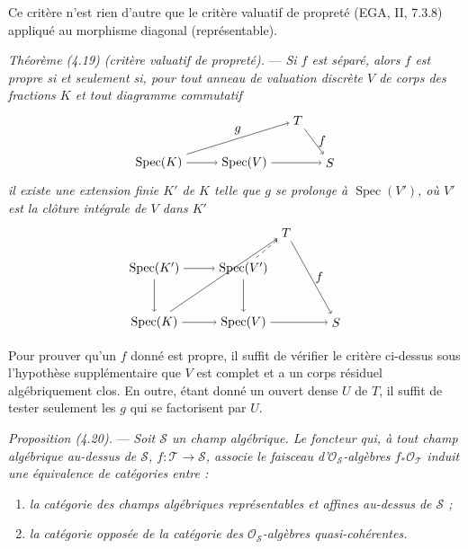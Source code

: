 \documentclass[10pt]{article}
\newcommand{\Spec}{\operatorname{Spec}}
\newcommand{\cO}{\mathcal O}
\begin{document}
Ce critère n'est rien d'autre que le critère valuatif de propreté (EGA, II, 7.3.8) appliqué au morphisme diagonal (représentable).

\medskip
\noindent\emph{Théorème (4.19) (critère valuatif de propreté).} --- \emph{Si $f$ est séparé, alors $f$ est propre si et seulement si, pour tout anneau de valuation discrète $V$ de corps des fractions $K$ et tout diagramme commutatif}
\[
\begin{tikzpicture}[baseline=(current bounding box.center)]
\node (K) at (0,0) {$\Spec(K)$};
\node (V) at (2.4,0) {$\Spec(V)$};
\node (T) at (3.9,1.2) {$T$};
\node (S) at (4.8,0) {$S$};
\draw[->] (K) -- (V);
\draw[->] (V) -- (S);
\draw[->] (T) -- node[right] {$f$} (S);
\draw[->] (K) -- node[above] {$g$} (T);
\end{tikzpicture}
\]
\emph{il existe une extension finie $K'$ de $K$ telle que $g$ se prolonge à $\Spec(V')$, où $V'$ est la clôture intégrale de $V$ dans $K'$}
\[
\begin{tikzpicture}[baseline=(current bounding box.center)]
\node (Kp) at (0,1.5) {$\Spec(K')$};
\node (Vp) at (2.5,1.5) {$\Spec(V')$};
\node (T) at (3.7,2.5) {$T$};
\node (K) at (0,0) {$\Spec(K)$};
\node (V) at (2.5,0) {$\Spec(V)$};
\node (S) at (5.1,0) {$S$};
\draw[->] (Kp) -- (Vp);
\draw[->] (K) -- (V);
\draw[->] (Kp) -- (K);
\draw[->] (Vp) -- (V);
\draw[->] (V) -- (S);
\draw[->] (T) -- node[right] {$f$} (S);
\draw[->] (K) -- (T);
\draw[->,dashed] (Vp) -- (T);
\end{tikzpicture}
\]

Pour prouver qu'un $f$ donné est propre, il suffit de vérifier le critère ci-dessus sous l'hypothèse supplémentaire que $V$ est complet et a un corps résiduel algébriquement clos. En outre, étant donné un ouvert dense $U$ de $T$, il suffit de tester seulement les $g$ qui se factorisent par $U$.

\medskip
\noindent\emph{Proposition (4.20).} --- \emph{Soit $\mathscr S$ un champ algébrique. Le foncteur qui, à tout champ algébrique au-dessus de $\mathscr S$, $f:\mathscr T\to\mathscr S$, associe le faisceau d'$\cO_{\mathscr S}$-algèbres $f_*\cO_{\mathscr T}$ induit une équivalence de catégories entre :}
\begin{enumerate}[label=(\roman*)]
\item \emph{la catégorie des champs algébriques représentables et affines au-dessus de $\mathscr S$ ;}
\item \emph{la catégorie opposée de la catégorie des $\cO_{\mathscr S}$-algèbres quasi-cohérentes.}
\end{enumerate}
\end{document}
